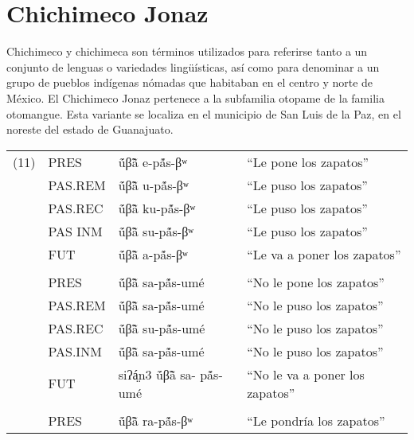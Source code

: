 \section*{Chichimeco Jonaz}

\noindent Chichimeco y chichimeca son términos utilizados para referirse tanto a un conjunto de lenguas o variedades lingüísticas, así como para denominar a un grupo de pueblos indígenas nómadas que habitaban en el centro y norte de México. El Chichimeco Jonaz pertenece a la subfamilia otopame de la familia otomangue. Esta variante se localiza en el municipio de San Luis de la Paz, en el noreste del estado de Guanajuato. \vspace{0.5cm}

{\setmainfont{Doulos SIL}
    \begin{tabular}{llll}
        (11) & PRES       & ṹβ̃ã e-pã́s-βʷ           & “Le pone los zapatos”          \\
             & PAS.REM    & ṹβ̃ã u-pã́s-βʷ           & “Le puso los zapatos”          \\
             & PAS.REC    & ṹβ̃ã ku-pã́s-βʷ          & “Le puso los zapatos”          \\
             & PAS INM    & ṹβ̃ã su-pã́s-βʷ          & “Le puso los zapatos”          \\
             & FUT        & ṹβ̃ã a-pã́s-βʷ           & “Le va a poner los zapatos”    \\
             &            &                        &                                \\
             & PRES       & ṹβ̃ã sa-pã́s-umé         & “No le pone los zapatos”       \\
             & PAS.REM    & ṹβ̃ã sa-pã́s-umé         & “No le puso los zapatos”       \\
             & PAS.REC    & ṹβ̃ã su-pã́s-umé         & “No le puso los zapatos”       \\
             & PAS.INM    & ṹβ̃ã sa-pã́s-umé         & “No le puso los zapatos”       \\
             & FUT        & siʔá̤n3 ṹβ̃ã sa- pã́s-umé & “No le va a poner los zapatos” \\
             &            &                        &                                \\
             & PRES       & ṹβ̃ã ra-pã́s-βʷ          & “Le pondría los zapatos”       \\

\end{tabular}}
